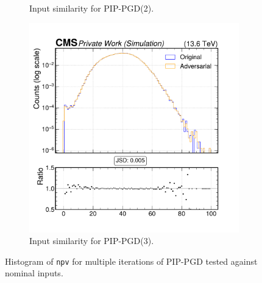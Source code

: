 \begin{figure}[h]
\begin{subfigure}[t]{0.32\textwidth}
    \caption*{Input similarity for PIP-PGD(2).}
  \end{subfigure}\hfill
  \begin{subfigure}[t]{0.32\textwidth}
    \includegraphics[width=\linewidth]{media/output/features/compare/combined_it_3/cmp_global_features_npv.pdf}
    \caption*{Input similarity for PIP-PGD(3).}
  \end{subfigure}

  \caption*{Histogram of \texttt{npv} for multiple iterations of PIP-PGD tested against nominal inputs.}
  \label{fig:combined_input_npv}
\end{figure}

